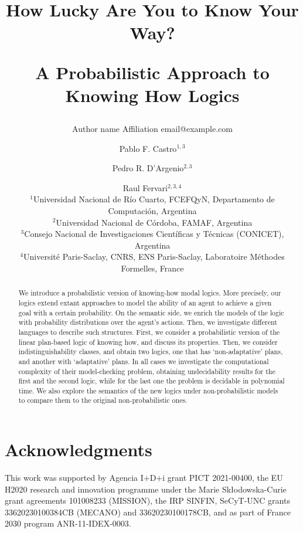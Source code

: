 \documentclass{article}
\title{How Lucky Are You to Know Your Way?\par A Probabilistic Approach to Knowing How Logics}   %
\author{%
    Author name
    \affiliations
    Affiliation
    \emails
    email@example.com    %
}
\author{%
Pablo F. Castro$^{1,3}$\and
Pedro R. D'Argenio$^{2,3}$\and
Raul Fervari$^{2,3,4}$ \\
\affiliations
$^1$Universidad Nacional de R\'io Cuarto, FCEFQyN, Departamento de Computaci\'on, Argentina\\
$^2$Universidad Nacional de C\'ordoba, FAMAF, Argentina\\
$^3$Consejo Nacional de Investigaciones Cient\'ificas y T\'ecnicas (CONICET), Argentina\\
$^4$Universit\'e Paris-Saclay, CNRS, ENS Paris-Saclay, Laboratoire M\'ethodes Formelles, France
}
\begin{document}
\maketitle

\begin{abstract}
  We introduce a probabilistic version of knowing-how modal logics.  More precisely,  our logics extend extant approaches to model the ability of an agent to achieve a given goal with a certain probability.  On the semantic side,  we enrich the models of the logic with probability distributions over the agent's actions.  Then, we investigate different languages to describe such structures.  First,  we consider a probabilistic version of the linear plan-based logic of knowing how, and discuss its properties. Then, we consider indistinguishability classes,  and obtain two logics,  one that has `non-adaptative' plans, and another  with `adaptative' plans. In all cases we investigate the computational complexity of their model-checking problem, obtaining undecidability results for the first and the second logic, while for the last one the problem is decidable in polynomial time. We also explore the semantics of the new logics under non-probabilistic models to compare them to the original non-probabilistic ones.
\end{abstract}







\section*{Acknowledgments}

This work was supported by Agencia I$+$D$+$i grant PICT 2021-00400,
%
the EU H2020 research and innovation programme
under the Marie Sk{\l}odowska-Curie grant agreements 101008233
({\scriptsize MISSION}),
%
the IRP SINFIN, 
%
SeCyT-UNC grants 33620230100384CB ({\scriptsize MECANO}) and 33620230100178CB,
and as part of France 2030 program ANR-11-IDEX-0003.
%











% 
\end{document}
